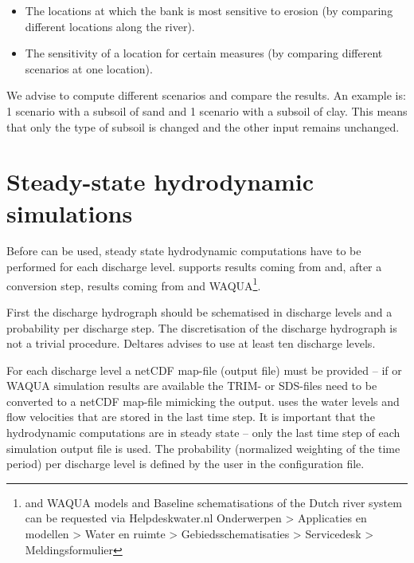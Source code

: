 \begin{itemize}
\item The locations at which the bank is most sensitive to erosion (by comparing different locations along the river).
\item The sensitivity of a location for certain measures (by comparing different scenarios at one location).
\end{itemize}

We advise to compute different scenarios and compare the results.
An example is: 1 scenario with a subsoil of sand and 1 scenario with a subsoil of clay.
This means that only the type of subsoil is changed and the other input remains unchanged.

\section{Steady-state hydrodynamic simulations}

Before \dfastbe can be used, steady state hydrodynamic computations have to be performed for each discharge level.
\dfastbe supports results coming from \dflowfm and, after a conversion step, results coming from \dflow and WAQUA\footnote{\dflowfm and WAQUA models and Baseline schematisations of the Dutch river system can be requested via Helpdeskwater.nl Onderwerpen > Applicaties en modellen > Water en ruimte > Gebiedsschematisaties > Servicedesk > Meldingsformulier}.

First the discharge hydrograph should be schematised in discharge levels and a probability per discharge step.
The discretisation of the discharge hydrograph is not a trivial procedure. Deltares advises to use at least ten discharge levels.

For each discharge level a netCDF map-file (\dflowfm output file) must be provided -- if \dflow or WAQUA simulation results are available the TRIM- or SDS-files need to be converted to a netCDF map-file mimicking the \dflowfm output.
\dfastbe uses the water levels and flow velocities that are stored in the last time step.
It is important that the hydrodynamic computations are in steady state -- only the last time step of each simulation output file is used.
The probability (normalized weighting of the time period) per discharge level is defined by the user in the configuration file.


